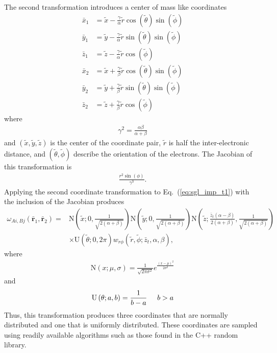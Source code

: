 \documentclass{revtex4}
\begin{document}
  The second transformation introduces a center of mass like coordinates 
  \begin{align}
    \bar{x}_1 &= \tilde{x} - \frac{\gamma}{\alpha} \tilde{r} \cos(\tilde{\theta}) \sin(\tilde{\phi}) \\
    \bar{y}_1 &= \tilde{y} - \frac{\gamma}{\alpha} \tilde{r} \sin(\tilde{\theta}) \sin(\tilde{\phi}) \\
    \bar{z}_1 &= \tilde{z} - \frac{\gamma}{\alpha} \tilde{r} \cos(\tilde{\phi}) \\
    \bar{x}_2 &= \tilde{x} + \frac{\gamma}{\beta} \tilde{r} \cos(\tilde{\theta}) \sin(\tilde{\phi}) \\
    \bar{y}_2 &= \tilde{y} + \frac{\gamma}{\beta} \tilde{r} \sin(\tilde{\theta}) \sin(\tilde{\phi}) \\
    \bar{z}_2 &= \tilde{z} + \frac{\gamma}{\beta} \tilde{r} \cos(\tilde{\phi})
  \end{align}
  where
  \begin{align}
    \gamma^2 = \frac{\alpha \beta}{\alpha + \beta}
  \end{align}
  and
  $(\tilde{x}, \tilde{y}, \tilde{z})$ is the center of the coordinate pair, $\tilde{r}$ is half the inter-electronic distance, and $(\tilde{\theta}, \tilde{\phi})$ describe the orientation of
  the electrons.
  The Jacobian of this transformation is
  \begin{align}
    \frac{r^2 \sin (\phi )}{\gamma ^3}.
  \end{align}
  Applying the second coordinate transformation to Eq.\ (\ref{eq:sgl_imp_t1}) with the inclusion of the Jacobian produces
  \begin{align}
    \omega_{Ai,Bj}(\bar{\mathbf{r}}_1, \bar{\mathbf{r}}_2) =& 
    \mathrm{N}\left(\tilde{x}; 0, \frac{1}{\sqrt{2(\alpha + \beta)}}\right)
    \mathrm{N}\left(\tilde{y}; 0, \frac{1}{\sqrt{2(\alpha + \beta)}}\right)
    \mathrm{N}\left(\tilde{z}; \frac{\bar{z}_t (\alpha -\beta )}{2 (\alpha +\beta )}, \frac{1}{\sqrt{2(\alpha + \beta)}}\right) \nonumber \\
    & \times \mathrm{U}\left(\tilde{\theta}; 0, 2 \pi\right)
    w_{r\phi}\left(\tilde{r}, \tilde{\phi}; \bar{z}_t, \alpha, \beta\right),
    \label{eq:sgl_imp_t2}
  \end{align}
  where 
  \begin{align}
    \mathrm{N}\left(x; \mu, \sigma\right) = \frac{1}{\sqrt{2\pi \sigma^2}} e^{\frac{(x-\mu)^2}{2 \sigma^2}}
  \end{align}
  and
  \begin{align}
    \mathrm{U}\left(\theta; a, b\right) = \frac{1}{b - a} \hspace{5mm} b>a
  \end{align}
  Thus, this transformation produces three coordinates that are normally distributed and one that is uniformly distributed. These coordinates are sampled using readily available algorithms such
  as those found in the C++ random library. 
  
\end{document}

